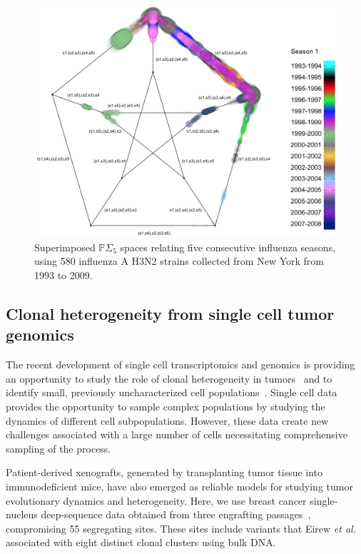 \documentclass[a4paper,11pt]{article}
\begin{document}
\begin{figure}
    \centering
    \includegraphics[width=6in]{figures/influenza_quint.png}
    \caption{Superimposed $\mathbb{P}\Sigma_5$ spaces relating five consecutive influenza seasons, using 580 influenza A H3N2 strains collected from New York from 1993 to 2009.}
    \label{fig:flu_quint}
\end{figure} 

\subsection{Clonal heterogeneity from single cell tumor genomics}

The recent development of single cell transcriptomics and genomics is providing an opportunity to study the role of clonal heterogeneity in tumors~\cite{navin2011tumour, eirew2014dynamics, patel2014single} and to identify small, previously uncharacterized cell populations~\cite{grun2015single}.
Single cell data provides the opportunity to sample complex populations by studying the dynamics of different cell subpopulations.
However, these data create new challenges associated with a large number of cells necessitating comprehensive sampling of the process. 

Patient-derived xenografts, generated by transplanting tumor tissue into immunodeficient mice, have also emerged as reliable models for studying tumor evolutionary dynamics and heterogeneity.
Here, we use breast cancer single-nucleus deep-sequence data obtained from three engrafting passages~\cite{eirew2014dynamics}, compromising 55 segregating sites.
These sites include variants that Eirew \textit{et al.} associated with eight distinct clonal clusters using bulk DNA.
\end{document}
